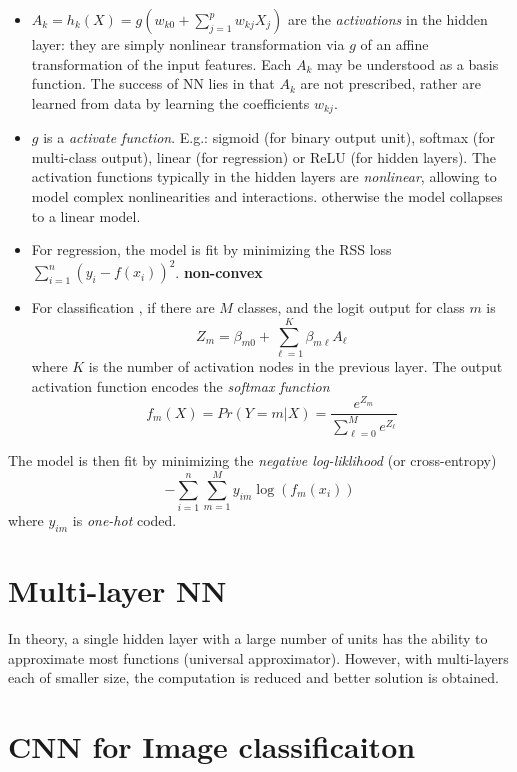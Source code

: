 \documentclass[
  letterpaper,
  DIV=11,
  numbers=noendperiod]{scrreprt}
\begin{document}
\begin{itemize}
\item
  \(A_k =h_k(X)= g(w_{k0}+\sum_{j=1}^p w_{kj}X_j)\) are the
  \emph{activations} in the hidden layer: they are simply nonlinear
  transformation via \(g\) of an affine transformation of the input
  features. Each \(A_k\) may be understood as a basis function. The
  success of NN lies in that \(A_k\) are not prescribed, rather are
  learned from data by learning the coefficients \(w_{kj}\).
\item
  \(g\) is a \emph{activate function}. E.g.: sigmoid (for binary output
  unit), softmax (for multi-class output), linear (for regression) or
  ReLU (for hidden layers). The activation functions typically in the
  hidden layers are \emph{nonlinear}, allowing to model complex
  nonlinearities and interactions. otherwise the model collapses to a
  linear model.
\item
  For regression, the model is fit by minimizing the RSS loss
  \(\sum_{i=1}^n (y_i-f(x_i))^2\). \textbf{non-convex}
\item
  For classification , if there are \(M\) classes, and the logit output
  for class \(m\) is \[
  Z_m = \beta_{m0}+ \sum_{\ell=1}^K\beta_{m\ell}A_\ell
  \] where \(K\) is the number of activation nodes in the previous
  layer. The output activation function encodes the \emph{softmax
  function} \[
  f_m(X)= Pr(Y=m|X)=\frac{e^{Z_m}}{\sum_{\ell=0}^M e^{Z_\ell}}
  \]
\end{itemize}

The model is then fit by minimizing the \emph{negative log-liklihood}
(or cross-entropy) \[
-\sum_{i=1}^n \sum_{m=1}^M y_{im}\log(f_m(x_i))
\] where \(y_{im}\) is \emph{one-hot} coded.

\section{Multi-layer NN}\label{multi-layer-nn}

In theory, a single hidden layer with a large number of units has the
ability to approximate most functions (universal approximator). However,
with multi-layers each of smaller size, the computation is reduced and
better solution is obtained.

\section{CNN for Image
classificaiton}\label{cnn-for-image-classificaiton}
\end{document}
